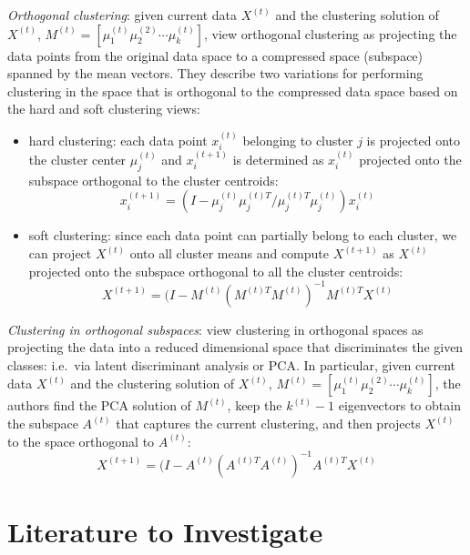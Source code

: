 \documentclass{article}
\numberwithin{equation}{section}
\numberwithin{thm}{section}
\begin{document}
\textit{Orthogonal clustering}: given current data $X^{(t)}$ and the clustering solution of $X^{(t)}$, $M^{(t)} = [\mu_1^{(t)} \mu_2^{(2)} \cdots \mu_k^{(t)}]$, \citet{Cui2007} view orthogonal clustering as projecting the data points from the original data space to a compressed space (subspace) spanned by the mean vectors. They describe two variations for performing clustering in the space that is orthogonal to the compressed data space based on the hard and soft clustering views:
\begin{itemize}
\item hard clustering: each data point $x_i^{(t)}$ belonging to cluster $j$ is projected onto the cluster center $\mu_j^{(t)}$ and $x_i^{(t+1)}$ is determined as $x_i^{(t)}$ projected onto the subspace orthogonal to the cluster centroids:
$$
x_i^{(t+1)} = (I - \mu_j^{(t)}\mu_j^{(t)T}/\mu_j^{(t)T}\mu_j^{(t)})x_i^{(t)}
$$
%
\item soft clustering: since each data point can partially belong to each cluster, we can project $X^{(t)}$ onto all cluster means and compute $X^{(t+1)}$ as $X^{(t)}$ projected onto the subspace orthogonal to all the cluster centroids:
$$
X^{(t+1)} = (I-M^{(t)}(M^{(t)T}M^{(t)})^{-1}M^{(t)T}X^{(t)} 
$$
\end{itemize}
%

\textit{Clustering in orthogonal subspaces}: \citet{Cui2007} view clustering in orthogonal spaces as projecting the data into a reduced dimensional space that discriminates the given classes: i.e.\ via latent discriminant analysis or PCA. In particular, given current data $X^{(t)}$ and the clustering solution of $X^{(t)}$, $M^{(t)} = [\mu_1^{(t)} \mu_2^{(2)} \cdots \mu_k^{(t)}]$, the authors find the PCA solution of $M^{(t)}$, keep the $k^{(t)}-1$ eigenvectors to obtain the subspace $A^{(t)}$ that captures the current clustering, and then projects $X^{(t)}$ to the space orthogonal to $A^{(t)}$:
$$
X^{(t+1)} = (I-A^{(t)}(A^{(t)T}A^{(t)})^{-1}A^{(t)T}X^{(t)} 
$$
\section{Literature to Investigate}

\cite{Griffiths2011}
\cite{Luxburg2007}
\cite{Cui2007}
\cite{Niu2010}
\cite{Niu2011}
\cite{Niu2012}
\cite{Higham2004}
\cite{yan2009fast}


\small{


}
\end{document}
